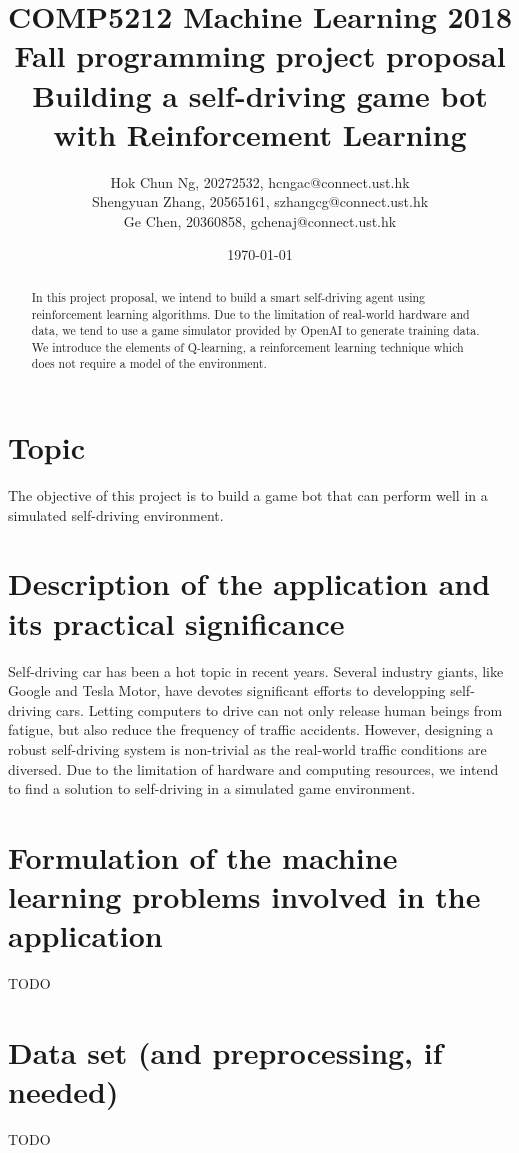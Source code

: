 \documentclass[a4paper]{article}
\title{COMP5212 Machine Learning 2018 Fall programming project proposal \\ 
       Building a self-driving game bot with Reinforcement Learning}
\author{Hok Chun Ng, 20272532, hcngac@connect.ust.hk \\
        Shengyuan Zhang, 20565161, szhangcg@connect.ust.hk \\
        Ge Chen, 20360858, gchenaj@connect.ust.hk}
\date{\today}
\begin{document}
\maketitle

\begin{abstract}
In this project proposal, we intend to build a smart self-driving agent using
reinforcement learning algorithms. Due to the limitation of real-world hardware
and data, we tend to use a game simulator provided by OpenAI to generate training
data. We introduce the elements of Q-learning, a reinforcement learning technique
which does not require a model of the environment.
\end{abstract}

\section{Topic}

The objective of this project is to build a game bot that can perform well in a
simulated self-driving environment. 

\section{Description of the application and its practical significance}

Self-driving car has been a hot topic in recent years. Several industry giants,
like Google and Tesla Motor, have devotes significant efforts to developping
self-driving cars. Letting computers to drive
can not only release human beings from fatigue, but also reduce the frequency of
traffic accidents. However, designing a robust self-driving system is non-trivial
as the real-world traffic conditions are diversed. Due to the limitation of
hardware and computing resources, we intend to find a solution to self-driving in
a simulated game environment.


\section{Formulation of the machine learning problems involved in the application}

TODO

\section{Data set (and preprocessing, if needed)}

TODO
\end{document}
